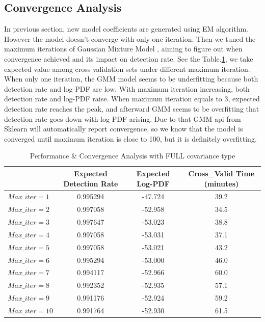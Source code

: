 \documentclass[12pt,DIV14,BCOR12mm,a4paper,footinclude=false,headinclude,parskip=half-,twoside,openright,cleardoublepage=empty,toc=index,bibliography=totoc,listof=totoc]{scrreprt}
\numberwithin{equation}{chapter}
\begin{document}
\subsection{Convergence Analysis}
In previous section, new model coefficients are generated using EM algorithm. However the model doesn't converge with only one iteration. Then we tuned the maximum iterations of Gaussian Mixture Model , aiming to figure out when convergence achieved and its impact on detection rate. See the Table.\ref{fullcov}, we take expected value among cross validation sets under different maximum iteration. When only one iteration, the GMM model seems to be underfitting because both detection rate and log-PDF are low. With maximum iteration increasing, both detection rate and log-PDF raise. When maximum iteration equals to 3, expected detection rate reaches the peak, and afterward GMM seems to be overfitting that detection rate goes down with log-PDF arising. Due to that GMM api from Sklearn will automatically report convergence, so we know that the model is converged until maximum iteration is close to 100, but it is definitely overfitting.

\begin{table}
	\centering
	\caption{Performance \& Convergence Analysis with FULL covariance type}
	\label{fullcov}
	\begin{tabular}{lccc}
		\toprule
& Expected Detection Rate & Expected Log-PDF & Cross\_Valid Time (minutes) \\
\midrule
$Max\_iter=1$ & 0.995294 & -47.724 &  39.2 \\
$Max\_iter=2$ & 0.997058 & -52.958 &  34.5 \\
$Max\_iter=3$ & 0.997647 & -53.023 &  38.8 \\
$Max\_iter=4$ & 0.997058 & -53.031 &  37.1 \\
$Max\_iter=5$ & 0.997058 & -53.021 &  43.2 \\
$Max\_iter=6$ & 0.995294 & -53.000 &  46.0 \\
$Max\_iter=7$ & 0.994117 & -52.966 &  60.0 \\
$Max\_iter=8$ & 0.992352 & -52.935 &  57.1 \\
$Max\_iter=9$ & 0.991176 & -52.924 &  59.2 \\
$Max\_iter=10$ & 0.991764 & -52.930 &  61.5 \\
\bottomrule
	\end{tabular}
\end{table}
\end{document}
